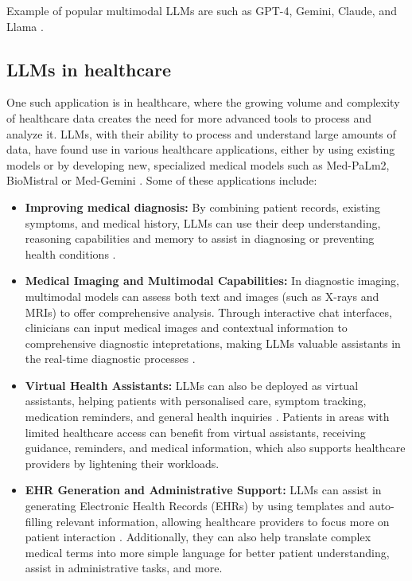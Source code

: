 Example of popular multimodal LLMs are such as GPT-4, Gemini, Claude, and Llama \parencite{gpt4,gemini,llama3,claude}.

\subsection{LLMs in healthcare}

One such application is in healthcare, where the growing volume and complexity of healthcare data creates the need for more advanced tools to process and analyze it. LLMs, with their ability to process and understand large amounts of data, have found use in various healthcare applications, either by using existing models or by developing new, specialized medical models such as Med-PaLm2, BioMistral or Med-Gemini \parencite{biomistral,medgemini,medpalm2}. Some of these applications include:

\begin{itemize}
    \item \textbf{Improving medical diagnosis:} By combining patient records, existing symptoms, and medical history, LLMs can use their deep understanding, reasoning capabilities and memory to assist in diagnosing or preventing health conditions \parencite{llm_healthcare,llm_healthcare3,llm_healthcare4}.
    \item \textbf{Medical Imaging and Multimodal Capabilities:} In diagnostic imaging, multimodal models can assess both text and images (such as X-rays and MRIs) to offer comprehensive analysis. Through interactive chat interfaces, clinicians can input medical images and contextual information to comprehensive diagnostic intepretations, making LLMs valuable assistants in the real-time diagnostic processes \parencite{llm_healthcare3}.
    \item \textbf{Virtual Health Assistants:} LLMs can also be deployed as virtual assistants, helping patients with personalised care, symptom tracking, medication reminders, and general health inquiries \parencite{llm_healthcare,llm_healthcare3}. Patients in areas with limited healthcare access can benefit from virtual assistants, receiving guidance, reminders, and medical information, which also supports healthcare providers by lightening their workloads.
    \item \textbf{EHR Generation and Administrative Support:} LLMs can assist in generating Electronic Health Records (EHRs) by using templates and auto-filling relevant information, allowing healthcare providers to focus more on patient interaction \parencite{llm_healthcare4}. Additionally, they can also help translate complex medical terms into more simple language for better patient understanding, assist in administrative tasks, and more.
\end{itemize}

